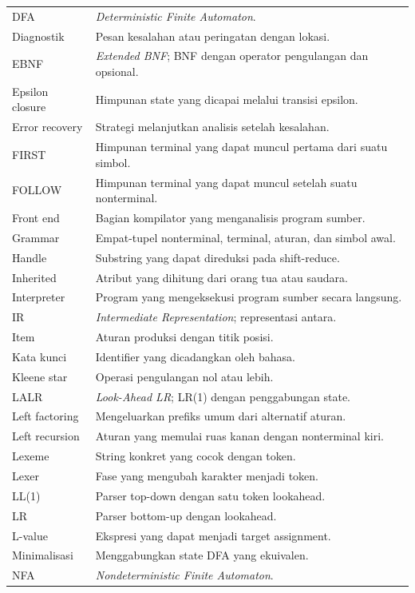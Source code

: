 {\begin{longtable}{@{}p{3.8cm}p{10.8cm}@{}}
DFA & \emph{Deterministic Finite Automaton}. \\
Diagnostik & Pesan kesalahan atau peringatan dengan lokasi. \\
EBNF & \emph{Extended BNF}; BNF dengan operator pengulangan dan
opsional. \\
Epsilon closure & Himpunan state yang dicapai melalui transisi
epsilon. \\
Error recovery & Strategi melanjutkan analisis setelah kesalahan. \\
FIRST & Himpunan terminal yang dapat muncul pertama dari suatu
simbol. \\
FOLLOW & Himpunan terminal yang dapat muncul setelah suatu
nonterminal. \\
Front end & Bagian kompilator yang menganalisis program sumber. \\
Grammar & Empat-tupel nonterminal, terminal, aturan, dan simbol
awal. \\
Handle & Substring yang dapat direduksi pada shift-reduce. \\
Inherited & Atribut yang dihitung dari orang tua atau saudara. \\
Interpreter & Program yang mengeksekusi program sumber secara
langsung. \\
IR & \emph{Intermediate Representation}; representasi antara. \\
Item & Aturan produksi dengan titik posisi. \\
Kata kunci & Identifier yang dicadangkan oleh bahasa. \\
Kleene star & Operasi pengulangan nol atau lebih. \\
LALR & \emph{Look-Ahead LR}; LR(1) dengan penggabungan state. \\
Left factoring & Mengeluarkan prefiks umum dari alternatif aturan. \\
Left recursion & Aturan yang memulai ruas kanan dengan nonterminal
kiri. \\
Lexeme & String konkret yang cocok dengan token. \\
Lexer & Fase yang mengubah karakter menjadi token. \\
LL(1) & Parser top-down dengan satu token lookahead. \\
LR & Parser bottom-up dengan lookahead. \\
L-value & Ekspresi yang dapat menjadi target assignment. \\
Minimalisasi & Menggabungkan state DFA yang ekuivalen. \\
NFA & \emph{Nondeterministic Finite Automaton}. \\

\end{longtable}}
